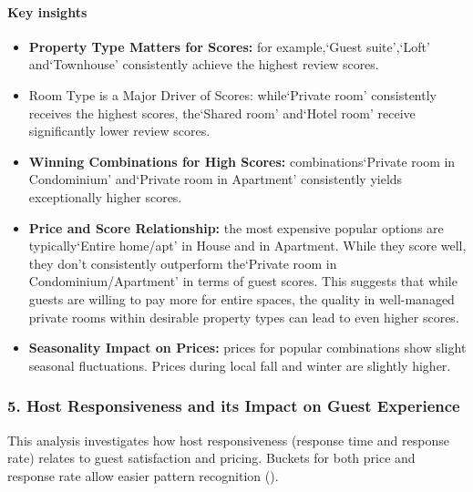\vspace{0.5em}
\paragraph{Key insights}
\begin{itemize}
    \item \textbf{Property Type Matters for Scores:} for example,`Guest suite',`Loft' and`Townhouse' consistently achieve the highest review scores.
    \item Room Type is a Major Driver of Scores: while`Private room' consistently receives the highest scores, the`Shared room' and`Hotel room' receive significantly lower review scores.
    \item \textbf{Winning Combinations for High Scores:} combinations`Private room in Condominium' and`Private room in Apartment' consistently yields exceptionally higher scores.
    \item \textbf{Price and Score Relationship:} the most expensive popular options are typically`Entire home/apt' in House and in Apartment. While they score well, they don't consistently outperform the`Private room in Condominium/Apartment' in terms of guest scores. This suggests that while guests are willing to pay more for entire spaces, the quality in well-managed private rooms within desirable property types can lead to even higher scores.
    \item \textbf{Seasonality Impact on Prices:} prices for popular combinations show slight seasonal fluctuations. Prices during local fall and winter are slightly higher.

\end{itemize}


\subsubsection*{5. Host Responsiveness and its Impact on Guest Experience}

This analysis investigates how host responsiveness (response time and response rate) relates to guest satisfaction and pricing. Buckets for both price and response rate allow easier pattern recognition ().

\vspace{0.5em}
